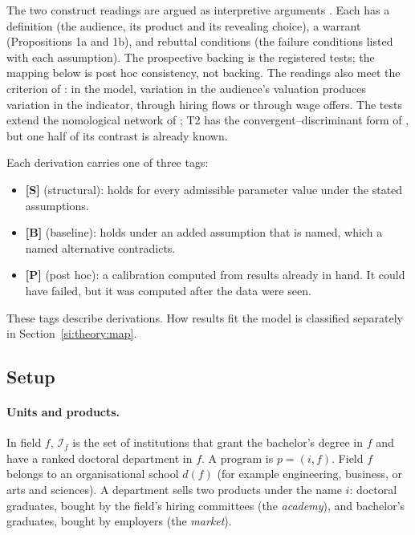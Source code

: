 The two construct readings are argued as interpretive arguments \citep{kane2013validating}. Each has a
definition (the audience, its product and its revealing choice), a warrant (Propositions 1a and 1b), and
rebuttal conditions (the failure conditions listed with each assumption). The prospective backing is the
registered tests; the mapping below is post hoc consistency, not backing. The readings also meet the criterion of
\citet{borsboom2004concept}: in the model, variation in the audience's valuation produces variation in the
indicator, through hiring flows or through wage offers. The tests extend the nomological network of
\citet{cronbach1955construct}; T2 has the convergent--discriminant form of \citet{campbell1959convergent}, but one
half of its contrast is already known.

Each derivation carries one of three tags:
\begin{itemize}
\item \textbf{[S]} (structural): holds for every admissible parameter value under the stated assumptions.
\item \textbf{[B]} (baseline): holds under an added assumption that is named, which a named alternative contradicts.
\item \textbf{[P]} (post hoc): a calibration computed from results already in hand. It could have failed, but it
was computed after the data were seen.
\end{itemize}
These tags describe derivations. How results fit the model is classified separately in
Section~\ref{si:theory:map}.

\subsection{Setup}\label{si:theory:setup}

\paragraph{Units and products.} In field $f$, $\mathcal I_f$ is the set of institutions that grant the
bachelor's degree in $f$ and have a ranked doctoral department in $f$. A program is $p=(i,f)$. Field $f$ belongs
to an organisational school $d(f)$ (for example engineering, business, or arts and sciences). A department sells
two products under the name $i$: doctoral graduates, bought by the field's hiring committees (the
\emph{academy}), and bachelor's graduates, bought by employers (the \emph{market}).

